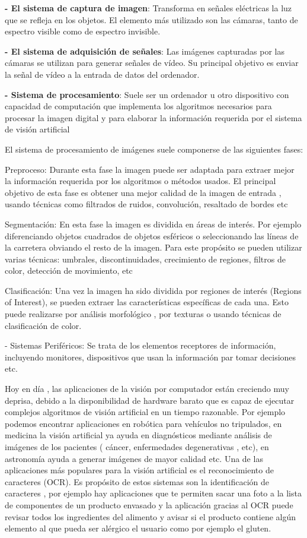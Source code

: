 	\textbf{- El sistema de captura de imagen}: Transforma en señales eléctricas la luz que se refleja en los objetos. El elemento más utilizado son las cámaras, tanto de espectro visible como de espectro invisible.

	\textbf{- El sistema de adquisición de señales}: Las imágenes capturadas por las cámaras se utilizan para generar señales de vídeo. Su principal objetivo es enviar la señal de vídeo a la entrada de datos del ordenador.

	\textbf{- Sistema de procesamiento}: Suele ser un ordenador u otro dispositivo con capacidad de computación que implementa los algoritmos necesarios para procesar la imagen digital y para elaborar la información requerida por el sistema de visión artificial

	El sistema de procesamiento de imágenes suele componerse de las siguientes fases:

		Preproceso: Durante esta fase la imagen puede ser adaptada para extraer mejor la información requerida por los algoritmos o métodos usados. El principal objetivo de esta fase es obtener una mejor calidad de la imagen de entrada , usando técnicas como filtrados de ruidos, convolución, resaltado de bordes etc

		Segmentación: En esta fase la imagen es dividida en áreas de interés. Por ejemplo diferenciando objetos cuadrados de objetos esféricos o seleccionando las líneas de la carretera obviando el resto de la imagen. Para este propósito se pueden utilizar varias técnicas: umbrales, discontinuidades, crecimiento de regiones, filtros de color, detección de movimiento, etc

		Clasificación: Una vez la imagen ha sido dividida por regiones de interés (Regions of Interest), se pueden extraer las características específicas de cada una. Esto puede realizarse por análisis morfológico , por texturas o usando técnicas de clasificación de color.

	- Sistemas Periféricos: Se trata de los elementos receptores de información, incluyendo monitores, dispositivos que usan la información par tomar decisiones etc.

Hoy en día , las aplicaciones de la visión por computador están creciendo muy deprisa, debido a la disponibilidad de hardware barato que es capaz de ejecutar complejos algoritmos de visión artificial en un tiempo razonable. Por ejemplo podemos encontrar aplicaciones en robótica para vehículos no tripulados, en medicina la visión artificial ya ayuda en diagnósticos mediante análisis de imágenes de los pacientes ( cáncer, enfermedades degenerativas , etc), en astronomía ayuda a generar imágenes de mayor calidad etc.
Una de las aplicaciones más populares para la visión artificial es el reconocimiento de caracteres (OCR). Es propósito de estos sistemas son la identificación de caracteres , por ejemplo hay aplicaciones que te permiten sacar una foto a la lista de componentes de un producto envasado y la aplicación gracias al OCR puede revisar todos los ingredientes del alimento y avisar si el producto contiene algún elemento al que pueda ser alérgico el usuario como por ejemplo el gluten.



